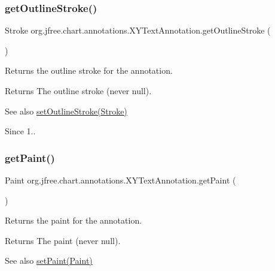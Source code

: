 \subsubsection{\texorpdfstring{get\+Outline\+Stroke()}{getOutlineStroke()}}
{\footnotesize\ttfamily Stroke org.\+jfree.\+chart.\+annotations.\+X\+Y\+Text\+Annotation.\+get\+Outline\+Stroke (\begin{DoxyParamCaption}{ }\end{DoxyParamCaption})}

Returns the outline stroke for the annotation.

\begin{DoxyReturn}{Returns}
The outline stroke (never {\ttfamily null}).
\end{DoxyReturn}
\begin{DoxySeeAlso}{See also}
\mbox{\hyperlink{classorg_1_1jfree_1_1chart_1_1annotations_1_1_x_y_text_annotation_af3e01447131d46bad78ca98e9bcbf3b1}{set\+Outline\+Stroke(\+Stroke)}}
\end{DoxySeeAlso}
\begin{DoxySince}{Since}
1.. 
\end{DoxySince}
\mbox{\label{classorg_1_1jfree_1_1chart_1_1annotations_1_1_x_y_text_annotation_a371cab8abb30565c9d1d35b322eceb86}} 
\subsubsection{\texorpdfstring{get\+Paint()}{getPaint()}}
{\footnotesize\ttfamily Paint org.\+jfree.\+chart.\+annotations.\+X\+Y\+Text\+Annotation.\+get\+Paint (\begin{DoxyParamCaption}{ }\end{DoxyParamCaption})}

Returns the paint for the annotation.

\begin{DoxyReturn}{Returns}
The paint (never {\ttfamily null}).
\end{DoxyReturn}
\begin{DoxySeeAlso}{See also}
\mbox{\hyperlink{classorg_1_1jfree_1_1chart_1_1annotations_1_1_x_y_text_annotation_a813998d3f4ba3c498c21540d35ac5826}{set\+Paint(\+Paint)}} 
\end{DoxySeeAlso}
\mbox{\label{classorg_1_1jfree_1_1chart_1_1annotations_1_1_x_y_text_annotation_acb3aaa58e15cdca9253e36b3a35217fd}} 
